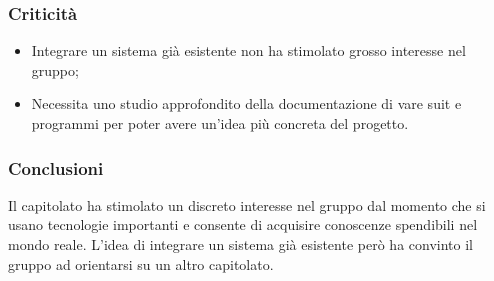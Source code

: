 		\subsubsection{Criticità}
			\begin{itemize}
				\item Integrare un sistema già esistente non ha stimolato grosso interesse nel gruppo;
				\item Necessita uno studio approfondito della documentazione di vare suit e programmi per poter avere un'idea più concreta del progetto.
			\end{itemize}

		\subsubsection{Conclusioni}
			Il capitolato ha stimolato un discreto interesse nel gruppo dal momento che si usano tecnologie importanti e consente di acquisire conoscenze spendibili nel mondo reale. L'idea di integrare un sistema già esistente però ha convinto il gruppo ad orientarsi su un altro capitolato.
